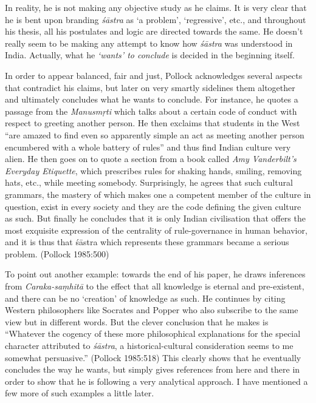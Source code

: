 In reality, he is not making any objective study as he claims. It is very clear that he is bent upon branding {\it śāstra} as `a problem', `regressive', etc., and throughout his thesis, all his postulates and logic are directed towards the same. He doesn't really seem to be making any attempt to know how {\it śāstra} was understood in India. Actually, what he \textit{`wants' to conclude} is decided in the beginning itself. 

In order to appear balanced, fair and just, Pollock acknowledges several aspects that contradict his claims, but later on very smartly sidelines them altogether and ultimately concludes what he wants to conclude. For instance, he quotes a passage from the {\it Manusmṛti} which talks about a certain code of conduct with respect to greeting another person. He then exclaims that students in the West ``are amazed to find even so apparently simple an act as meeting another person encumbered with a whole battery of rules'' and thus find Indian culture very alien. He then goes on to quote a section from a book called \textit{Amy Vanderbilt’s Everyday Etiquette}, which prescribes rules for shaking hands, smiling, removing hats, etc., while meeting somebody. Surprisingly, he agrees that such cultural grammars, the mastery of which makes one a competent member of the culture in question, exist in every society and they are the code defining the given culture as such. But finally he concludes that it is only Indian civilisation that offers the most exquisite expression of the centrality of rule-governance in human behavior, and it is thus that śāstra which represents these grammars became a serious problem. (Pollock 1985:500)

To point out another example: towards the end of his paper, he draws inferences from \textit{Caraka-saṃhitā} to the effect that all knowledge is eternal and pre-existent, and there can be no `creation' of knowledge as such. He continues by citing Western philosophers like Socrates and Popper who also subscribe to the same view but in different words. But the clever conclusion that he makes is ``Whatever the cogency of these more philosophical explanations for the special character attributed to {\it śāstra}, a historical-cultural consideration seems to me somewhat persuasive.'' (Pollock 1985:518) This clearly shows that he eventually concludes the way he wants, but simply gives references from here and there in order to show that he is following a very analytical approach. I have mentioned a few more of such examples a little later.

